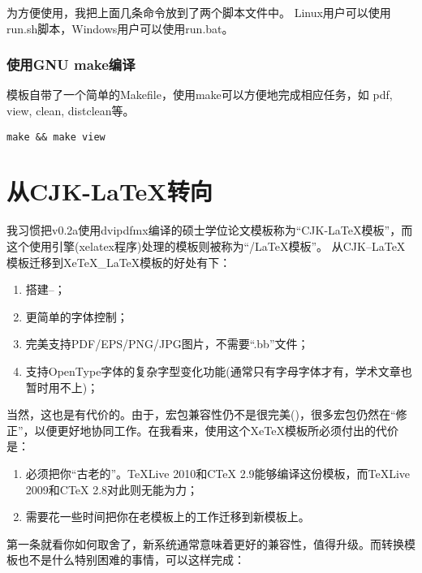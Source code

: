 为方便使用，我把上面几条命令放到了两个脚本文件中。
Linux用户可以使用run.sh脚本，Windows用户可以使用run.bat。

\subsubsection{使用GNU make编译}

模板自带了一个简单的Makefile，使用make可以方便地完成相应任务，如 pdf, view, clean, distclean等。

\begin{lstlisting}[basicstyle=\small\ttfamily, caption={使用GNU make编译}, numbers=none]
make && make view
\end{lstlisting}

\section{从CJK-\LaTeX{}转向\XeTeX}
\label{sec:whydvipdfm}

我习惯把v0.2a使用dvipdfmx编译的硕士学位论文模板称为``CJK-\LaTeX{}模板''，而这个使用\XeTeX{}引擎(xelatex程序)处理的模板则被称为``\XeTeX/\LaTeX{}模板''。
从CJK--LaTeX模板迁移到XeTeX\_LaTeX模板的好处有下：
\begin{enumerate}
\item[\large\smiley] 搭建--；
\item[\large\smiley] 更简单的字体控制；
\item[\large\smiley] 完美支持PDF/EPS/PNG/JPG图片，不需要``.bb''文件；
\item[\large\smiley] 支持OpenType字体的复杂字型变化功能(通常只有字母字体才有，学术文章也暂时用不上)；
\end{enumerate}

当然，这也是有代价的。由于，宏包兼容性仍不是很完美()，很多宏包仍然在“修正”，以便更好地协同工作。在我看来，使用这个XeTeX模板所必须付出的代价是：

\begin{enumerate}
\item[\large\frownie] 必须把你“古老的”。TeXLive 2010和CTeX 2.9能够编译这份模板，而TeXLive 2009和CTeX 2.8对此则无能为力；
\item[\large\frownie] 需要花一些时间把你在老模板上的工作迁移到新模板上。
\end{enumerate}

第一条就看你如何取舍了，新系统通常意味着更好的兼容性，值得升级。而转换模板也不是什么特别困难的事情，可以这样完成：


